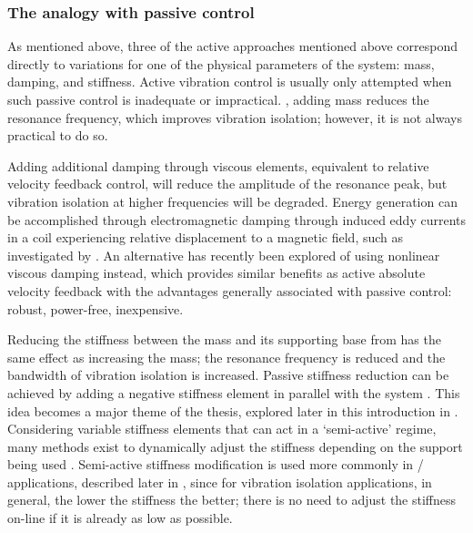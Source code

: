 \subsubsection{The analogy with passive control}

As mentioned above, three of the active approaches mentioned above correspond directly to variations for one of the physical parameters of the system: mass, damping, and stiffness.
Active vibration control is usually only attempted when such passive control is inadequate or impractical.
\Eg, adding mass reduces the resonance frequency, which improves vibration isolation; however, it is not always practical to do so.

Adding additional damping through viscous elements, equivalent to relative velocity feedback control, will reduce the amplitude of the resonance peak, but vibration isolation at higher frequencies will be degraded.
Energy generation can be accomplished through electromagnetic damping through induced eddy currents in a coil experiencing relative displacement to a magnetic field, such as investigated by \textcite{graves2000}.
An alternative has recently been explored of using nonlinear viscous damping instead, which provides similar benefits as active absolute velocity feedback  \cite{lang2009} with the advantages generally associated with passive control: robust, power-free, inexpensive.

Reducing the stiffness between the mass and its supporting base from has the same effect as increasing the mass; the resonance frequency is reduced and the bandwidth of vibration isolation is increased.
Passive stiffness reduction can be achieved by adding a negative stiffness element in parallel with the system \cite{lee2007-jsv,xing2005}.
This idea becomes a major theme of the thesis, explored later in this introduction in .
Considering variable stiffness elements that can act in a `semi-active' regime, many methods exist to dynamically adjust the stiffness depending on the support being used \cite[for example]{kidner2002,liu2006-jsv,liu2008-jsv}.
Semi-active stiffness modification is used more commonly in \vibneut/ applications, described later in , since for vibration isolation applications, in general, the lower the stiffness the better; there is no need to adjust the stiffness on-line if it is already as low as possible.

